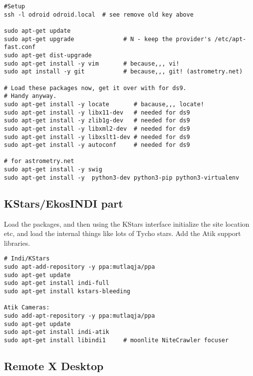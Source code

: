 \documentclass[letter,11pt,oneside]{article}
\begin{document}
\begin{tcolorbox} %
\begingroup \fontsize{10pt}{10pt}
\selectfont
\begin{verbatim} 
#Setup
ssh -l odroid odroid.local  # see remove old key above

sudo apt-get update
sudo apt-get upgrade              # N - keep the provider's /etc/apt-fast.conf
sudo apt-get dist-upgrade
sudo apt-get install -y vim       # because,,, vi!
sudo apt install -y git           # because,,, git! (astrometry.net)

# Load these packages now, get it over with for ds9.
# Handy anyway.
sudo apt-get install -y locate       # bacause,,, locate!
sudo apt-get install -y libx11-dev   # needed for ds9
sudo apt-get install -y zlib1g-dev   # needed for ds9
sudo apt-get install -y libxml2-dev  # needed for ds9
sudo apt-get install -y libxslt1-dev # needed for ds9
sudo apt-get install -y autoconf     # needed for ds9

# for astrometry.net
sudo apt-get install -y swig
sudo apt-get install -y  python3-dev python3-pip python3-virtualenv
\end{verbatim}
\endgroup
\end{tcolorbox}


\subsection{KStars/EkosINDI part}  \label{sec:indipart}

Load the packages, and then using the KStars interface initialize the
site location etc, and load the internal things like lots of Tycho
stars. Add the Atik support libraries.

\begin{tcolorbox} %
\begingroup \fontsize{10pt}{10pt}
\selectfont
\begin{verbatim} 
# Indi/KStars
sudo apt-add-repository -y ppa:mutlaqja/ppa
sudo apt-get update
sudo apt-get install indi-full
sudo apt-get install kstars-bleeding

Atik Cameras:
sudo add-apt-repository -y ppa:mutlaqja/ppa
sudo apt-get update
sudo apt-get install indi-atik
sudo apt-get install libindi1     # moonlite NiteCrawler focuser

\end{verbatim}
\endgroup
\end{tcolorbox}

\subsection{Remote X Desktop}  \label{sec:xrdp}
\end{document}
